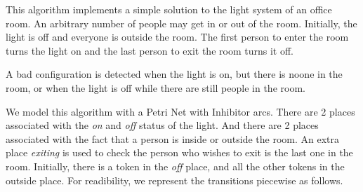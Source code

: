 This algorithm implements a simple solution to the light system of an
office room. An arbitrary number of people may get in or out of the
room.
%
Initially, the light is off and everyone is outside the room.
%
The first person to enter the room turns the light on and the last
person to exit the room turns it off.
%

%
A bad configuration is detected when the light is on, but there is
noone in the room, or when the light is off while there are still
people in the room.

We model this algorithm with a Petri Net with Inhibitor arcs.  There
are 2 places associated with the \emph{on} and \emph{off} status of
the light. %
And there are 2 places associated with the fact that a person is
inside or outside the room. %
An extra place \emph{exiting} is used to check the person who wishes
to exit is the last one in the room. %
Initially, there is a token in the \emph{off} place, and all the other
tokens in the outside place. %
For readibility, we represent the transitions piecewise as follows.


